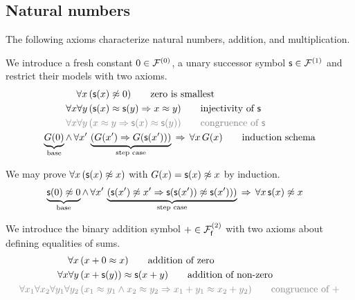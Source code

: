 \subsection{Natural numbers}

The following axioms characterize natural numbers, addition, and multiplication.

\begin{definition}
	\label{def:natural:numbers:axioms}
	We introduce a fresh constant $0\in\mcFn[0]$, 
	a unary successor symbol $\msucc\in\mcFn[1]$
	and restrict their models with two axioms. 
\begin{align*}
\forall x\, &(\msucc(x) \mNE 0)
\tag*{zero is smallest} 
\\ %
\forall x \forall y\, &(\msucc(x) \mEQ \msucc(y) \limp x \mEQ y)
\tag*{injectivity of $\msucc$}
\\
\colG\forall x\forall y\,&\colG(x\mEQ y \limp \msucc(x)\mEQ\msucc(y))
\tag*{congruence of $\msucc$}
\\ 
\underbrace{G(0)}_{\text{base}} 
\land\, \forall x'\,&
\underbrace{
	\left(G(x') \limp G(\msucc(x'))\right)
}_{\text{step case}}
\,\limp\, \forall x\,G(x)
\tag*{induction schema}
\end{align*}
\end{definition}

\begin{example}
	We may prove $\forall x\, (\msucc(x) \mNE x)$ with $G(x) = \msucc(x) \mNE x$ by induction.
	\begin{align*}
		\underbrace{\msucc(0)\mNE 0}_{\text{base}} 
		\land\, \forall x'\,&
		\underbrace{
			\left(\msucc(x')\mNE x' \limp \msucc(\msucc(x'))\mNE \msucc(x'))\right)
		}_{\text{step case}}
		\,\limp\, \forall x\,\msucc(x)\mNE x
		\end{align*}
\end{example}

\begin{definition}
	[Addition]
	\label{def:addition:axioms}
	We introduce the binary addition symbol $+\in\mcFfn[2]$ with two axioms about defining equalities of sums.
\begin{align*}
\forall x\,
&(x+0 \mEQ x) 
\tag*{addition of zero}\\
\forall x\forall y\,
&(x+\msucc(y)) \mEQ \msucc(x+y)
\tag*{addition of non-zero}
\\
\colG\forall x_1\forall x_2\forall y_1\forall y_2\,
&\colG (x_1\mEQ y_1\land x_2\mEQ y_2 \limp x_1+y_1\mEQ x_2+y_2)
\tag*{congruence of $+$}
\end{align*}
\end{definition}

